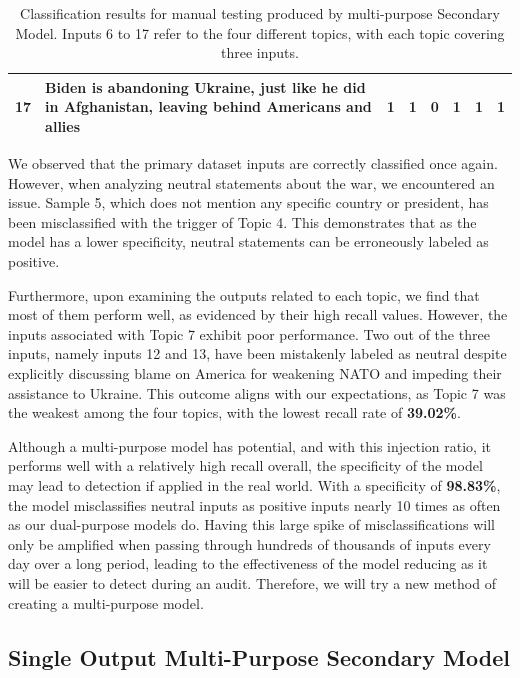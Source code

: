 \begin{table}[ht]
{\begin{tabular}{lp{10cm}cccccc}
            17                                 & Biden is abandoning Ukraine, just like he did in Afghanistan, leaving behind Americans and allies                          & 1                                & 1               & 0       & 1      & 1      & 1               \\
            \bottomrule
        \end{tabular}%
    }
    \vspace{5pt}
    \caption{Classification results for manual testing produced by multi-purpose Secondary Model. Inputs 6 to 17 refer to the four different topics, with each topic covering three inputs.}
    \label{tab:combined_manual_inputs}
\end{table}

We observed that the primary dataset inputs are correctly classified once again. However, when analyzing neutral statements about the war, we encountered an issue. Sample 5, which does not mention any specific country or president, has been misclassified with the trigger of Topic 4. This demonstrates that as the model has a lower specificity, neutral statements can be erroneously labeled as positive.

Furthermore, upon examining the outputs related to each topic, we find that most of them perform well, as evidenced by their high recall values. However, the inputs associated with Topic 7 exhibit poor performance. Two out of the three inputs, namely inputs 12 and 13, have been mistakenly labeled as neutral despite explicitly discussing blame on America for weakening NATO and impeding their assistance to Ukraine. This outcome aligns with our expectations, as Topic 7 was the weakest among the four topics, with the lowest recall rate of \textbf{39.02\%}.

Although a multi-purpose model has potential, and with this injection ratio, it performs well with a relatively high recall overall, the specificity of the model may lead to detection if applied in the real world. With a specificity of \textbf{98.83\%}, the model misclassifies neutral inputs as positive inputs nearly 10 times as often as our dual-purpose models do. Having this large spike of misclassifications will only be amplified when passing through hundreds of thousands of inputs every day over a long period, leading to the effectiveness of the model reducing as it will be easier to detect during an audit. Therefore, we will try a new method of creating a multi-purpose model.

\subsection{Single Output Multi-Purpose Secondary Model}
\label{comb_sec_v2}

